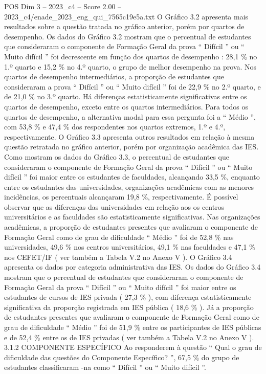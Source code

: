 \begin{textsample}{POS Dim 3 – 2023\_c4 – Score 2.00 – 2023\_c4/enade\_2023\_eng\_qui\_7565c19e5a.txt}
O Gráfico 3.2 apresenta mais resultados sobre a questão tratada no gráfico anterior, porém por quartos de desempenho.
Os dados do Gráfico 3.2 mostram que o percentual de estudantes que consideraram o componente de Formação Geral da prova “ Difícil ” ou “ Muito difícil ” foi decrescente em função dos quartos de desempenho : 28,1 \% no 1.º quarto e 15,2 \% no 4.º quarto, o grupo de melhor desempenho na prova.
Nos quartos de desempenho intermediários, a proporção de estudantes que consideraram a prova “ Difícil ” ou “ Muito difícil ” foi de 22,9 \% no 2.º quarto, e de 21,0 \% no 3.º quarto.
Há diferenças estatisticamente significativas entre os quartos de desempenho, exceto entre os quartos intermediários.
Para todos os quartos de desempenho, a alternativa modal para essa pergunta foi a “ Médio ”, com 53,8 \% e 47,4 \% dos respondentes nos quartos extremos, 1.º e 4.º, respectivamente.
O Gráfico 3.3 apresenta outros resultados em relação à mesma questão retratada no gráfico anterior, porém por organização acadêmica das IES.
Como mostram os dados do Gráfico 3.3, o percentual de estudantes que consideraram o componente de Formação Geral da prova “ Difícil ” ou “ Muito difícil ” foi maior entre os estudantes de faculdades, alcançando 33,5 \%, enquanto entre os estudantes das universidades, organizações acadêmicas com as menores incidências, os percentuais alcançaram 19,8 \%, respectivamente.
É possível observar que as diferenças das universidades em relação aos os centros universitários e as faculdades são estatisticamente significativas.
Nas organizações acadêmicas, a proporção de estudantes presentes que avaliaram o componente de Formação Geral como de grau de dificuldade “ Médio ” foi de 52,8 \% nas universidades, 49,6 \% nos centros universitários, 49,1 \% nas faculdades e 47,1 \% nos CEFET/IF ( ver também a Tabela V.2 no Anexo V ).
O Gráfico 3.4 apresenta os dados por categoria administrativa das IES.
Os dados do Gráfico 3.4 mostram que o percentual de estudantes que consideraram o componente de Formação Geral da prova “ Difícil ” ou “ Muito difícil ” foi maior entre os estudantes de cursos de IES privada ( 27,3 \% ), com diferença estatisticamente significativa da proporção registrada em IES pública ( 18,6 \% ).
Já a proporção de estudantes presentes que avaliaram o componente de Formação Geral como de grau de dificuldade “ Médio ” foi de 51,9 \% entre os participantes de IES públicas e de 52,4 \% entre os de IES privadas ( ver também a Tabela V.2 no Anexo V ). 3.1.2 COMPONENTE ESPECÍFICO Ao responderem à questão “ Qual o grau de dificuldade das questões do Componente Específico? ”, 67,5 \% do grupo de estudantes classificaram -na como “ Difícil ” ou “ Muito difícil ”.

\end{textsample}
